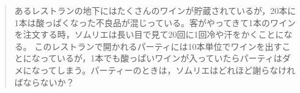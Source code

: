 \begin{quote}
	あるレストランの地下にはたくさんのワインが貯蔵されているが，20本に1本は酸っぱくなった不良品が混じっている。客がやってきて1本のワインを注文する時，ソムリエは長い目で見て20回に1回冷や汗をかくことになる。
	このレストランで開かれるパーティには10本単位でワインを出すことになっているが，1本でも酸っぱいワインが入っていたらパーティはダメになってしまう。パーティーのときは，ソムリエはどれほど謝らなければならないか？
\end{quote}
